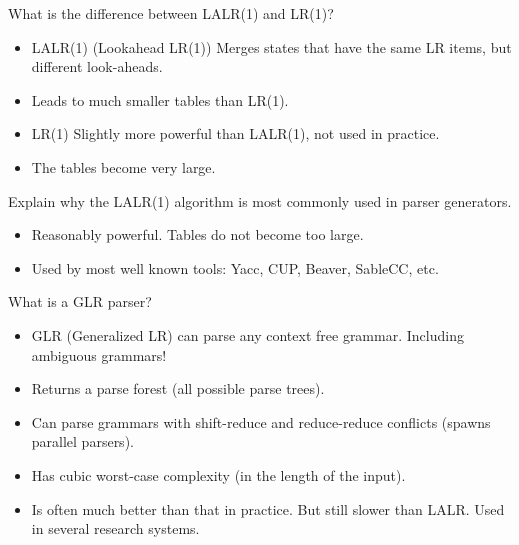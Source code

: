 \documentclass[11pt]{beamer}
\begin{document}
\begin{frame}
\begin{block}{What is the difference between LALR(1) and LR(1)?}
\begin{itemize}
\item LALR(1) (Lookahead LR(1)) Merges states that have the same LR items, but different look-aheads.
\item Leads to much smaller tables than LR(1).
\item LR(1) Slightly more powerful than LALR(1), not used in practice.
\item The tables become very large.
\end{itemize}
\end{block}

\begin{block}{Explain why the LALR(1) algorithm is most commonly used in parser generators.}
\begin{itemize}
\item Reasonably powerful. Tables do not become too large.
\item Used by most well known tools: Yacc, CUP, Beaver, SableCC, etc.
\end{itemize}
\end{block}

\end{frame}


\begin{frame}
\begin{block}{What is a GLR parser?}
\begin{itemize}
\item GLR (Generalized LR) can parse any context free grammar. Including ambiguous grammars!
\item Returns a parse forest (all possible parse trees).
\item Can parse grammars with shift-reduce and reduce-reduce conflicts (spawns parallel parsers).
\item Has cubic worst-case complexity (in the length of the input).
\item Is often much better than that in practice. But still slower than LALR. Used in several research systems.
\end{itemize}
\end{block}
\end{frame}
\end{document}
